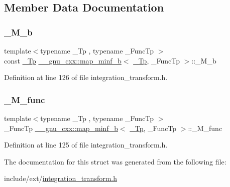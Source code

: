\subsection{Member Data Documentation}
\mbox{\label{struct____gnu__cxx_1_1map__minf__b_a03b2c7b30f21200812f87251cd0aff66}} 
\subsubsection{\texorpdfstring{\+\_\+\+M\+\_\+b}{\_M\_b}}
{\footnotesize\ttfamily template$<$typename \+\_\+\+Tp , typename \+\_\+\+Func\+Tp $>$ \\
const \hyperlink{namespace____gnu__cxx_a3b19a9c800ca194374ef9172290f7d79}{\+\_\+\+Tp} \hyperlink{struct____gnu__cxx_1_1map__minf__b}{\+\_\+\+\_\+gnu\+\_\+cxx\+::map\+\_\+minf\+\_\+b}$<$ \hyperlink{namespace____gnu__cxx_a3b19a9c800ca194374ef9172290f7d79}{\+\_\+\+Tp}, \+\_\+\+Func\+Tp $>$\+::\+\_\+\+M\+\_\+b}



Definition at line 126 of file integration\+\_\+transform.\+h.

\mbox{\label{struct____gnu__cxx_1_1map__minf__b_a6eeb7b723b6bb691690adfbdec7b4648}} 
\subsubsection{\texorpdfstring{\+\_\+\+M\+\_\+func}{\_M\_func}}
{\footnotesize\ttfamily template$<$typename \+\_\+\+Tp , typename \+\_\+\+Func\+Tp $>$ \\
\+\_\+\+Func\+Tp \hyperlink{struct____gnu__cxx_1_1map__minf__b}{\+\_\+\+\_\+gnu\+\_\+cxx\+::map\+\_\+minf\+\_\+b}$<$ \hyperlink{namespace____gnu__cxx_a3b19a9c800ca194374ef9172290f7d79}{\+\_\+\+Tp}, \+\_\+\+Func\+Tp $>$\+::\+\_\+\+M\+\_\+func}



Definition at line 125 of file integration\+\_\+transform.\+h.



The documentation for this struct was generated from the following file\+:\begin{DoxyCompactItemize}
\item 
include/ext/\hyperlink{integration__transform_8h}{integration\+\_\+transform.\+h}\end{DoxyCompactItemize}
